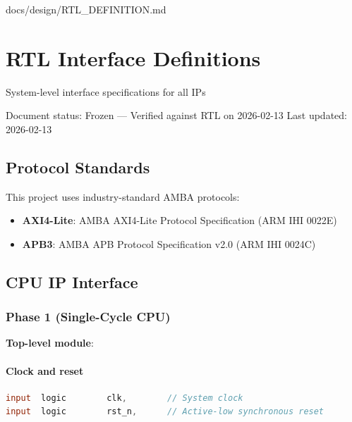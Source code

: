 \begin{relocated}{docs/design/RTL_DEFINITION.md}
\section{RTL Interface Definitions}\label{ds:ch:rtl-definition}

System-level interface specifications for all IPs

Document status: Frozen --- Verified against RTL on 2026-02-13 Last
updated: 2026-02-13

\subsection{Protocol Standards}\label{ds:ch:rtl-definition:protocol-standards}

This project uses industry-standard AMBA protocols:

\begin{itemize}
\tightlist
\item
  \textbf{AXI4-Lite}: AMBA AXI4-Lite Protocol Specification (ARM IHI
  0022E)
\item
  \textbf{APB3}: AMBA APB Protocol Specification v2.0 (ARM IHI 0024C)
\end{itemize}

\subsection{CPU IP Interface}\label{ds:ch:rtl-definition:cpu-ip-interface}

\subsubsection{Phase 1 (Single-Cycle CPU)}\label{ds:ch:rtl-definition:phase-1-single-cycle-cpu}

\textbf{Top-level module}: 

\paragraph{Clock and reset}\label{ds:ch:rtl-definition:clock-and-reset}

\begin{lstlisting}[language=Verilog]
input  logic        clk,        // System clock
input  logic        rst_n,      // Active-low synchronous reset
\end{lstlisting}


\end{relocated}
